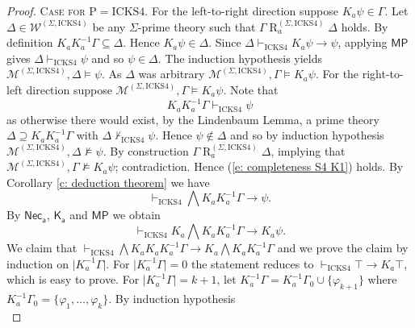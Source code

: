 \documentclass{myifcolog}
\newcommand{\K}{K}
\newcommand{\agi}{a}
\newcommand{\fw}{\mathcal{M}}
\newcommand{\Rel}{\mathrel{R}}
\newcommand{\W}{\mathcal{W}}
\newcommand{\hicks}{\mathrm{ICKS4}}
\newcommand{\hickp}{\mathrm{P}}
\numberwithin{theorem}{section}
\begin{document}
\begin{proof}
     \noindent \textsc{Case for $\hickp = \hicks$.} For the left-to-right direction suppose $\K_\agi \psi \in \Gamma$. Let $\Delta \in \W^{(\Sigma, \hicks)}$ be any $\Sigma$-prime theory such that $\Gamma \Rel_\agi^{(\Sigma, \hicks)} \Delta$ holds. By definition $\K_\agi \K_\agi^{-1} \Gamma \subseteq \Delta$. Hence $\K_\agi \psi \in \Delta$. Since $\Delta \vdash_\hicks \K_\agi \psi \rightarrow \psi$, applying $\mathsf{MP}$ gives $\Delta \vdash_\hicks \psi$ and so $\psi \in \Delta$. The induction hypothesis yields $\fw^{(\Sigma, \hicks)}, \Delta \models \psi$. As $\Delta$ was arbitrary $\fw^{(\Sigma, \hicks)}, \Gamma \models \K_\agi \psi$. For the right-to-left direction suppose $\fw^{(\Sigma, \hicks)}, \Gamma \models \K_\agi \psi$. Note that
    \begin{equation}\label{e: completeness S4 K1}
       \K_\agi \K_\agi^{-1} \Gamma \vdash_\hicks \psi
    \end{equation}
    as otherwise there would exist, by the Lindenbaum Lemma, a prime theory $\Delta \supseteq \K_\agi \K_\agi^{-1} \Gamma$ with $\Delta \not \vdash_\hicks \psi$. Hence $\psi \not \in \Delta$ and so by induction hypothesis $\fw^{(\Sigma, \hicks)}, \Delta \not \models \psi$. By construction $\Gamma \Rel_\agi^{(\Sigma, \hicks)} \Delta$, implying that $\fw^{(\Sigma, \hicks)}, \Gamma \not \models \K_\agi \psi$; contradiction. Hence (\ref{e: completeness S4 K1}) holds. By Corollary \ref{c: deduction theorem} we have
    \begin{equation}\label{e: completeness S4 K2}
        \vdash_\hicks \bigwedge \K_\agi \K_\agi^{-1} \Gamma \rightarrow \psi.
    \end{equation}
    By $\mathsf{Nec_\agi}$, $\mathsf{K_\agi}$ and $\mathsf{MP}$ we obtain
    \begin{equation}\label{e: completeness S4 K3}
        \vdash_\hicks \K_\agi \bigwedge \K_\agi \K_\agi^{-1} \Gamma \rightarrow \K_\agi \psi.
    \end{equation}
   We claim that $\vdash_\hicks \bigwedge \K_\agi \K_\agi \K_\agi^{-1} \Gamma \rightarrow \K_\agi \bigwedge \K_\agi \K_\agi^{-1} \Gamma$ and we prove the claim by induction on $\lvert \K_\agi^{-1} \Gamma \rvert$. For ${\lvert \K_\agi^{-1} \Gamma \rvert = 0}$ the statement reduces to $\vdash_\hicks  \top \rightarrow \K_\agi \top$, which is easy to prove. For ${\lvert \K_\agi^{-1} \Gamma \rvert = k+1}$, let $\K_\agi^{-1} \Gamma = \K_\agi^{-1}\Gamma_0 \cup \{\varphi_{k+1}\}$ where $ \K_\agi^{-1} \Gamma_0= \{\varphi_1, \ldots,\varphi_k\}$. By induction hypothesis
   \begin{equation}\label{e: completeness S4 K4}

\end{equation}
\end{proof}
\end{document}
